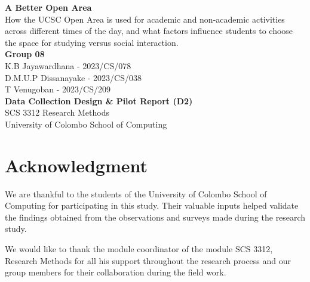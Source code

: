 \documentclass[12pt, a4paper]{report}
\begin{document}

\begin{titlepage}
    \centering
    \vspace*{2cm}
    \Huge\textbf{A Better Open Area}\\
    \vspace{0.5cm}
    \Large How the UCSC Open Area is used for academic and
non-academic activities across different times of the day,
and what factors influence students to choose the space
for studying versus social interaction.\\
    \vspace{6.5cm}
    \textbf{Group 08}\\
    K.B Jayawardhana - 2023/CS/078\\
    D.M.U.P Dissanayake - 2023/CS/038\\
    T Venugoban - 2023/CS/209\\
    \vspace{2cm}
    \Large \textbf{Data Collection Design \& Pilot Report (D2)}\\
    \vspace{2cm}
    SCS 3312 Research Methods\\
    \vspace{0.25cm}
    \small University of Colombo School of Computing\\
    \vfill
\end{titlepage}

\chapter*{Acknowledgment}
We are thankful to the students of the University of Colombo School of Computing for participating in this study. Their valuable inputs helped validate 
the findings obtained from the observations and surveys made during the research study.

We would like to thank the module coordinator of the module SCS 3312, Research Methods for all his support throughout the research process and our group members for their collaboration during the field work.
\end{document}
